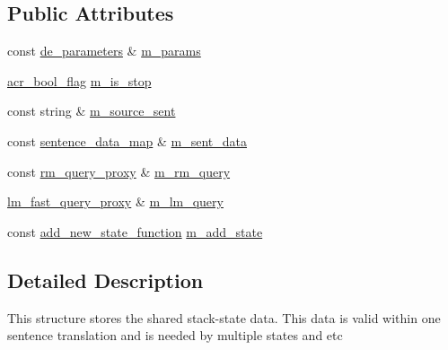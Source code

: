 \subsection*{Public Attributes}
\begin{DoxyCompactItemize}
\item 
const \hyperlink{namespaceuva_1_1smt_1_1bpbd_1_1server_1_1decoder_aaf4d5faf3a48156401c854d163d4b848}{de\+\_\+parameters} \& \hyperlink{structuva_1_1smt_1_1bpbd_1_1server_1_1decoder_1_1stack_1_1stack__data_a6cc1c4b3b29d164e2cbd8bd7ecfe1481}{m\+\_\+params}
\item 
\hyperlink{namespaceuva_1_1utils_1_1threads_a1c174d3a90b2b056554d897188ad2c74}{acr\+\_\+bool\+\_\+flag} \hyperlink{structuva_1_1smt_1_1bpbd_1_1server_1_1decoder_1_1stack_1_1stack__data_a124d8858f72a58128ffacc0c69266cdc}{m\+\_\+is\+\_\+stop}
\item 
const string \& \hyperlink{structuva_1_1smt_1_1bpbd_1_1server_1_1decoder_1_1stack_1_1stack__data_a334e2b5c19d275f48e65272e17df882c}{m\+\_\+source\+\_\+sent}
\item 
const \hyperlink{namespaceuva_1_1smt_1_1bpbd_1_1server_1_1decoder_1_1sentence_a95d9e3bcc492d0c638368631e3701ebb}{sentence\+\_\+data\+\_\+map} \& \hyperlink{structuva_1_1smt_1_1bpbd_1_1server_1_1decoder_1_1stack_1_1stack__data_a133db6ad9de700483f7e3b51a2af204d}{m\+\_\+sent\+\_\+data}
\item 
const \hyperlink{classuva_1_1smt_1_1bpbd_1_1server_1_1rm_1_1proxy_1_1rm__query__proxy}{rm\+\_\+query\+\_\+proxy} \& \hyperlink{structuva_1_1smt_1_1bpbd_1_1server_1_1decoder_1_1stack_1_1stack__data_acd5fa6a0402f15b19c29f300520fcea5}{m\+\_\+rm\+\_\+query}
\item 
\hyperlink{classuva_1_1smt_1_1bpbd_1_1server_1_1lm_1_1proxy_1_1lm__fast__query__proxy}{lm\+\_\+fast\+\_\+query\+\_\+proxy} \& \hyperlink{structuva_1_1smt_1_1bpbd_1_1server_1_1decoder_1_1stack_1_1stack__data_a8b8cf9dde11ed96934e2dc7b10d4724d}{m\+\_\+lm\+\_\+query}
\item 
const \hyperlink{namespaceuva_1_1smt_1_1bpbd_1_1server_1_1decoder_1_1stack_a3e1bb866f9fdf44bb23786748b3c791a}{add\+\_\+new\+\_\+state\+\_\+function} \hyperlink{structuva_1_1smt_1_1bpbd_1_1server_1_1decoder_1_1stack_1_1stack__data_a26b784830c267347251be53b8dce6914}{m\+\_\+add\+\_\+state}
\end{DoxyCompactItemize}


\subsection{Detailed Description}
This structure stores the shared stack-\/state data. This data is valid within one sentence translation and is needed by multiple states and etc 

